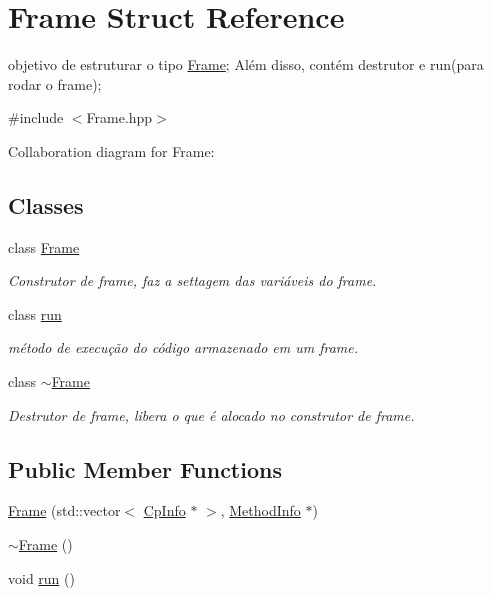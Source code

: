 \hypertarget{struct_frame}{}\section{Frame Struct Reference}
\label{struct_frame}


objetivo de estruturar o tipo \hyperlink{struct_frame}{Frame}; Além disso, contém destrutor e run(para rodar o frame);  




{\ttfamily \#include $<$Frame.\+hpp$>$}



Collaboration diagram for Frame\+:
\subsection*{Classes}
\begin{DoxyCompactItemize}
\item 
class \hyperlink{class_frame_1_1_frame}{Frame}
\begin{DoxyCompactList}\small\item\em Construtor de frame, faz a settagem das variáveis do frame. \end{DoxyCompactList}\item 
class \hyperlink{class_frame_1_1run}{run}
\begin{DoxyCompactList}\small\item\em método de execução do código armazenado em um frame. \end{DoxyCompactList}\item 
class \hyperlink{class_frame_1_1~_frame}{$\sim$\+Frame}
\begin{DoxyCompactList}\small\item\em Destrutor de frame, libera o que é alocado no construtor de frame. \end{DoxyCompactList}\end{DoxyCompactItemize}
\subsection*{Public Member Functions}
\begin{DoxyCompactItemize}
\item 
\hyperlink{struct_frame_abe0b370087d05267cab997ecdc78c4bd}{Frame} (std\+::vector$<$ \hyperlink{class_cp_info}{Cp\+Info} $\ast$ $>$, \hyperlink{struct_method_info}{Method\+Info} $\ast$)
\item 
\hyperlink{struct_frame_abec8c7bccdfc88cb4da137caae9f73d6}{$\sim$\+Frame} ()
\item 
void \hyperlink{struct_frame_a9aa2ef354e013a7cb95827c55a3b3a95}{run} ()
\end{DoxyCompactItemize}
